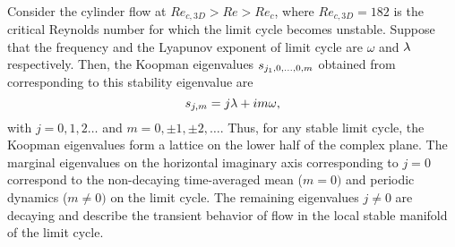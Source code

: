 \begin{description}
\\
%
Consider the cylinder flow at  $Re_{c,3D}>Re>Re_c$, where
$Re_{c,3D}=182$ is the critical Reynolds number for which the limit
cycle becomes unstable. Suppose that the frequency and the Lyapunov
exponent of limit cycle are $\omega$ and $\lambda$ respectively.
%
Then, the Koopman eigenvalues $s_{j_1,0,\dots,0,m}$ obtained
from   corresponding to this stability
eigenvalue are
%
\begin{equation}
\eigenvL_{j,m}  =  j \Lyap + im\omega, %
\label{eq:tracePeriod}
\end{equation}
%
with $j=0,1,2\dots$ and $m=0,\pm1,\pm 2,\dots$.
%
Thus, for any stable limit cycle, the Koopman eigenvalues form a
lattice on the lower half of the complex plane. The marginal
eigenvalues on the horizontal imaginary axis corresponding to $j=0$
correspond to the non-decaying time-averaged mean ($m=0)$ and
periodic dynamics ($m\neq 0)$ on the limit cycle.
The remaining
eigenvalues $j\neq 0$ are decaying and describe the transient
behavior of flow in the local stable manifold of the limit cycle.


\end{description}
